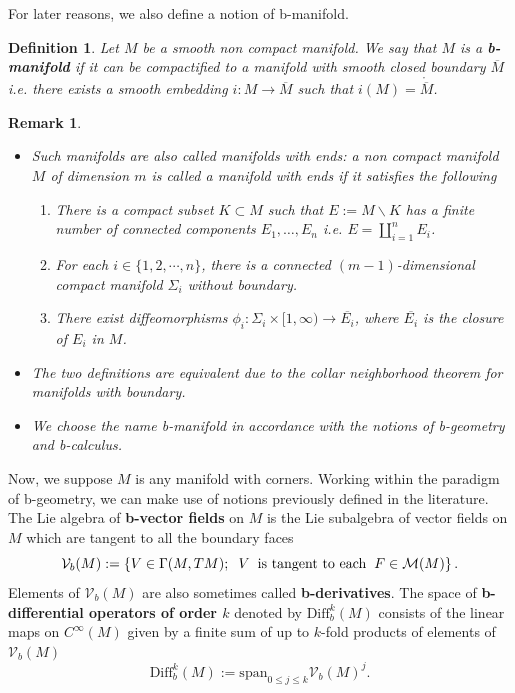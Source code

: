 \documentclass[a4paper,11pt]{article}
\newcounter{mythm}[section]
\newtheorem{defi}[mythm]{Definition}
\newtheorem{rem}[mythm]{Remark}
\begin{document}
\vspace{0.4cm}

For later reasons, we also define a notion of b-manifold.
\begin{defi}
Let $M$ be a smooth non compact manifold. We say that $M$ is a \textbf{b-manifold} if it can be compactified to a manifold with smooth closed boundary $\overline{M}$ i.e. there exists a smooth embedding $i : M \rightarrow \overline{M}$ such that $i(M) = \mathring{\overline{M}}$.
\end{defi}
\begin{rem}
\hfill
\begin{itemize}
\item Such manifolds are also called manifolds with ends: a non compact manifold $M$ of dimension $m$ is called a manifold with ends if it satisfies the following
        \begin{enumerate}
    \item There is a compact subset $K \subset M$ such that $E:=M \backslash K$ has a finite number of connected components $E_1, \ldots, E_n$ i.e. $E=\amalg_{i=1}^n E_i$.
    \item For each $i \in \{1,2,\cdots, n \}$, there is a connected $(m-1)$-dimensional compact manifold $\Sigma_i$ without boundary.
    \item There exist diffeomorphisms $\phi_i: \Sigma_i \times[1, \infty) \rightarrow \overline{E_i}$, where $\overline{E_i}$ is the closure of $E_i$ in $M$.
\end{enumerate}
\item The two definitions are equivalent due to the collar neighborhood theorem for manifolds with boundary. 
\item We choose the name b-manifold in accordance with the notions of b-geometry and b-calculus.
\end{itemize}
\end{rem}
Now, we suppose $M$ is any manifold with corners. Working within the paradigm of b-geometry, we can make use of notions previously defined in the literature.\\

The Lie algebra of \textbf{b-vector fields} on $M$ is the Lie subalgebra of vector fields on $M$ which are tangent to all the boundary faces 
$$
\mathcal{V}_b(M) := \left\{  
V \in \Gamma (M, T M) ; \hspace{0.2cm} V \hspace{0.2cm} \text{is tangent to each} \hspace{0.2cm}F \in \mathcal{M}(M) \right\}.
$$
Elements of $\mathcal{V}_b(M)$ are also sometimes called \textbf{b-derivatives}. The space of \textbf{b-differential operators of order $k$} denoted by $\mathrm{Diff}_b^k(M)$ consists of the linear maps on $C^\infty(M)$ given by a finite sum of up to $k$-fold products of elements of $\mathcal{V}_b(M)$
$$
\mathrm{Diff}_b^k(M) := \mathrm{span}_{0\leq j \leq k}\mathcal{V}_b(M)^j.
$$
\end{document}
